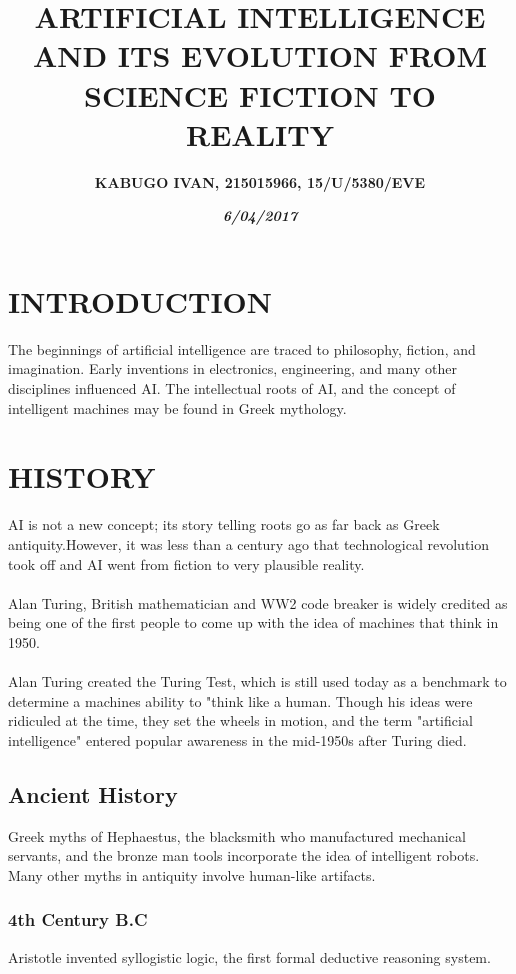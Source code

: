 \documentclass[a4paper,12pt]{report}
\begin{document}
\title{\textbf{ARTIFICIAL INTELLIGENCE AND ITS EVOLUTION FROM SCIENCE FICTION TO REALITY}}
\author{\textbf{KABUGO IVAN, 215015966, 15/U/5380/EVE}}
\date{\textit{\textbf{6/04/2017}}}
\maketitle
\section{INTRODUCTION}
{The beginnings of artificial intelligence are traced to philosophy, fiction, and imagination. Early inventions in electronics, engineering, and many other disciplines influenced AI. The intellectual roots of AI, and the concept of intelligent machines may be found in Greek mythology.} 

\section{HISTORY}

 AI is not a new concept; its story telling roots go as far back as Greek antiquity.However, it was less than a century ago that technological  revolution took off and AI went from fiction to very plausible reality.\\\\Alan Turing, British mathematician and WW2 code breaker is widely credited as being one of the first people to come up with the idea of machines that think in 1950.\\\\Alan Turing created the Turing Test, which is still used today as a benchmark to determine a machines ability to "think like a human. Though his ideas were ridiculed at the time, they set the wheels in motion, and the term "artificial intelligence" entered popular awareness in the mid-1950s after Turing died.

\subsection{Ancient History}
{Greek myths of Hephaestus, the blacksmith who manufactured mechanical servants, and the bronze man tools incorporate the idea of intelligent robots. Many other myths in antiquity involve human-like artifacts.}

\subsubsection*{4th Century B.C}
Aristotle invented syllogistic logic, the first formal deductive reasoning system.
\end{document}
